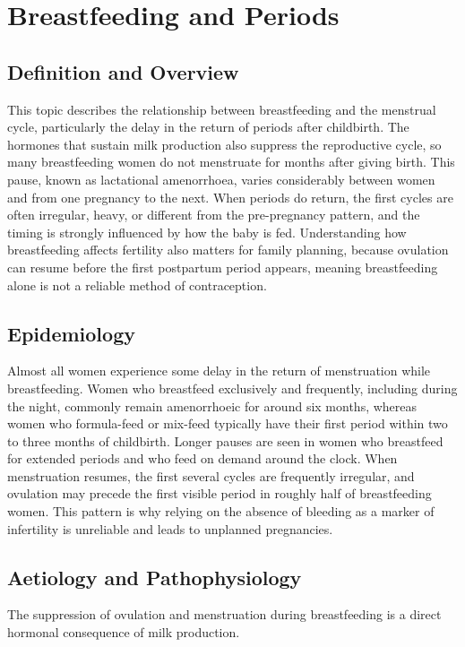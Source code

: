 \chapter{Breastfeeding and Periods}

\section*{Definition and Overview}
This topic describes the relationship between breastfeeding and the menstrual cycle, particularly the delay in the return of periods after childbirth. The hormones that sustain milk production also suppress the reproductive cycle, so many breastfeeding women do not menstruate for months after giving birth. This pause, known as lactational amenorrhoea, varies considerably between women and from one pregnancy to the next. When periods do return, the first cycles are often irregular, heavy, or different from the pre-pregnancy pattern, and the timing is strongly influenced by how the baby is fed. Understanding how breastfeeding affects fertility also matters for family planning, because ovulation can resume before the first postpartum period appears, meaning breastfeeding alone is not a reliable method of contraception.

\section*{Epidemiology}
Almost all women experience some delay in the return of menstruation while breastfeeding. Women who breastfeed exclusively and frequently, including during the night, commonly remain amenorrhoeic for around six months, whereas women who formula-feed or mix-feed typically have their first period within two to three months of childbirth. Longer pauses are seen in women who breastfeed for extended periods and who feed on demand around the clock. When menstruation resumes, the first several cycles are frequently irregular, and ovulation may precede the first visible period in roughly half of breastfeeding women. This pattern is why relying on the absence of bleeding as a marker of infertility is unreliable and leads to unplanned pregnancies.

\section*{Aetiology and Pathophysiology}
The suppression of ovulation and menstruation during breastfeeding is a direct hormonal consequence of milk production.


